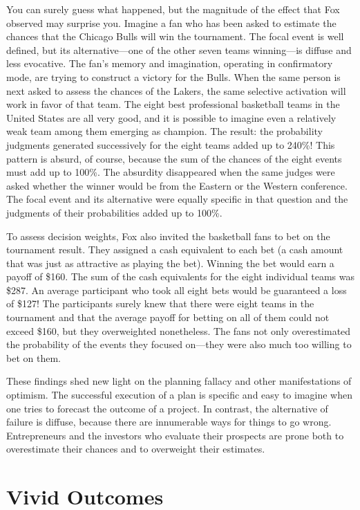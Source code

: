 \documentclass[11pt]{article}
\begin{document}
You can surely guess what happened, but the magnitude of the effect that Fox observed may surprise you. Imagine a fan who has been asked to estimate the chances that the Chicago Bulls will win the tournament. The focal event is well defined, but its alternative—one of the other seven teams winning—is diffuse and less evocative. The fan’s memory and imagination, operating in confirmatory mode, are trying to construct a victory for the Bulls. When the same person is next asked to assess the chances of the Lakers, the same selective activation will work in favor of that team. The eight best professional basketball teams in the United States are all very good, and it is possible to imagine even a relatively weak team among them emerging as champion. The result: the probability judgments generated successively for the eight teams added up to 240\%! This pattern is absurd, of course, because the sum of the chances of the eight events must add up to 100\%. The absurdity disappeared when the same judges were asked whether the winner would be from the Eastern or the Western conference. The focal event and its alternative were equally specific in that question and the judgments of their probabilities added up to 100\%.

To assess decision weights, Fox also invited the basketball fans to bet on the tournament result. They assigned a cash equivalent to each bet (a cash amount that was just as attractive as playing the bet). Winning the bet would earn a payoff of \$160. The sum of the cash equivalents for the eight individual teams was \$287. An average participant who took all eight bets would be guaranteed a loss of \$127! The participants surely knew that there were eight teams in the tournament and that the average payoff for betting on all of them could not exceed \$160, but they overweighted nonetheless. The fans not only overestimated the probability of the events they focused on—they were also much too willing to bet on them.

These findings shed new light on the planning fallacy and other manifestations of optimism. The successful execution of a plan is specific and easy to imagine when one tries to forecast the outcome of a project. In contrast, the alternative of failure is diffuse, because there are innumerable ways for things to go wrong. Entrepreneurs and the investors who evaluate their prospects are prone both to overestimate their chances and to overweight their estimates.

\section{Vivid Outcomes}
\label{sec:org83f6f56}
\end{document}
